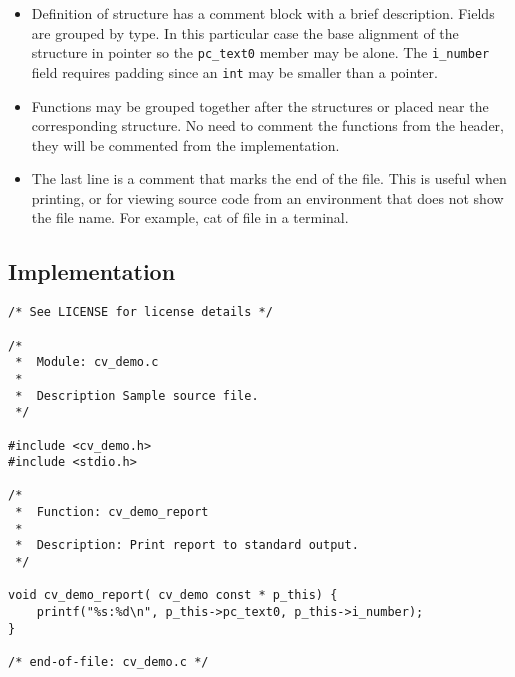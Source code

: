 \begin{itemize}
\item Definition of structure has a comment block with a brief description.
    Fields are grouped by type.  In this particular case the base alignment
    of the structure in pointer so the \texttt{pc\_text0} member may be
        alone.  The \texttt{i\_number} field requires padding since an
        \texttt{int} may be smaller than a pointer.

\item Functions may be grouped together after the structures or placed near
    the corresponding structure.  No need to comment the functions from
        the header, they will be commented from the implementation.

\item The last line is a comment that marks the end of the file.  This is
    useful when printing, or for viewing source code from an environment that
        does not show the file name.  For example, cat of file in a terminal.

\end{itemize}

\subsection{Implementation}

\begin{lstlisting}[caption={cv\_demo.c}]
/* See LICENSE for license details */

/*
 *  Module: cv_demo.c
 *
 *  Description Sample source file.
 */

#include <cv_demo.h>
#include <stdio.h>

/*
 *  Function: cv_demo_report
 *
 *  Description: Print report to standard output.
 */

void cv_demo_report( cv_demo const * p_this) {
    printf("%s:%d\n", p_this->pc_text0, p_this->i_number);
}

/* end-of-file: cv_demo.c */
\end{lstlisting}


